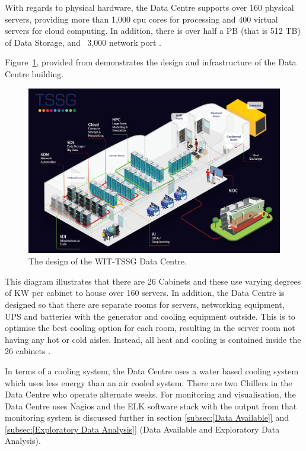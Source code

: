 \documentclass[12pt]{scrartcl}
\begin{document}
With regards to physical hardware, the Data Centre supports over 160 physical servers, providing more than 1,000 cpu cores for processing and 400 virtual servers for cloud computing.  In addition, there is over half a PB (that is 512 TB) of Data Storage, and ~3,000 network port \citep{TSSG}. 

Figure~\ref{fig:TSSGdataCentreDesign}, provided from \citet{TSSG} demonstrates the design and infrastructure of the Data Centre building.  

\begin{figure}[h]
  \caption{The design of the WIT-TSSG Data Centre.}
  \label{fig:TSSGdataCentreDesign}
  \centering
    \includegraphics[scale=0.35]{TSSG_Diagram}
\end{figure}

This diagram illustrates that there are 26 Cabinets and these use varying degrees of KW per cabinet to house over 160 servers. In addition, the Data Centre is designed so that there are separate rooms for servers, networking equipment, UPS and batteries with the generator and cooling equipment outside. This is to optimise the best cooling option for each room, resulting in the server room not having any hot or cold aisles. Instead, all heat and cooling is contained inside the 26 cabinets \citep{TSSG}.

In terms of a cooling system, the Data Centre uses a water based cooling system which uses less energy than an air cooled system. There are two Chillers in the Data Centre who operate alternate weeks. For monitoring and visualisation, the Data Centre uses Nagios and the ELK software stack \citep{ELK} with the output from that monitoring system is discussed further in section \ref{subsec:[Data Available]} and \ref{subsec:[Exploratory Data Analysis]} (Data Available and Exploratory Data Analysis). 
\end{document}
